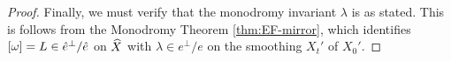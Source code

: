 \documentclass{amsart}
\begin{document}
\begin{proof}
Finally, we must verify that the monodromy invariant $\lambda$ is as stated.
This is follows from the Monodromy Theorem \ref{thm:EF-mirror}, which identifies $[\omega]=L\in \hat e^\perp/\hat e$
on ${\widehat X}$ with $\lambda\in e^\perp/e$ on the smoothing $X_t'$ of $X_0'$.
%
%
%
%
%
%
%
%
%
%
%

\end{proof}
\end{document}
